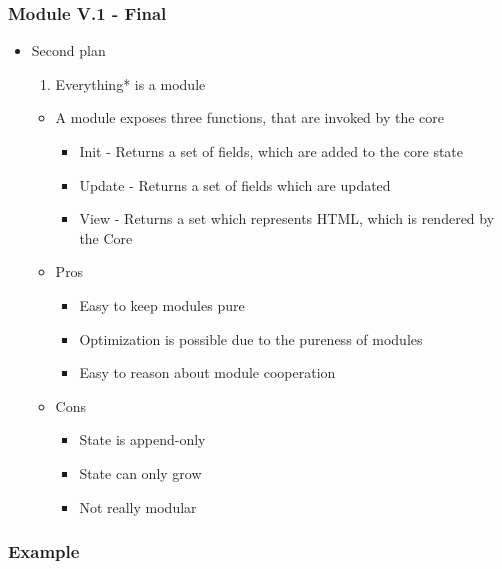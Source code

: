 \begin{frame}
  \frametitle{Module V.1 - Final}
  \begin{itemize}
    \item Second plan
      \pause
      \begin{enumerate}
        \item Everything* is a module
      \end{enumerate}
      \pause
      \begin{itemize}
        \item A module exposes three functions, that are invoked by the core
          \pause
          \begin{itemize}
            \item Init - Returns a set of fields, which are added to the core state
              \pause
            \item Update - Returns a set of fields which are updated
              \pause
            \item View - Returns a set which represents HTML, which is rendered by
              the Core
          \end{itemize}
          \pause
        \item Pros
          \pause
          \begin{itemize}
            \item Easy to keep modules pure
              \pause
            \item Optimization is possible due to the pureness of modules
              \pause
            \item Easy to reason about module cooperation
          \end{itemize}
          \pause
        \item Cons
          \pause
          \begin{itemize}
            \item State is append-only
              \pause
            \item State can only grow
              \pause
            \item Not really modular
          \end{itemize}
      \end{itemize}
  \end{itemize}
\end{frame}


\hidelogo
\begin{frame}
  \frametitle{Example}
  
\end{frame}

